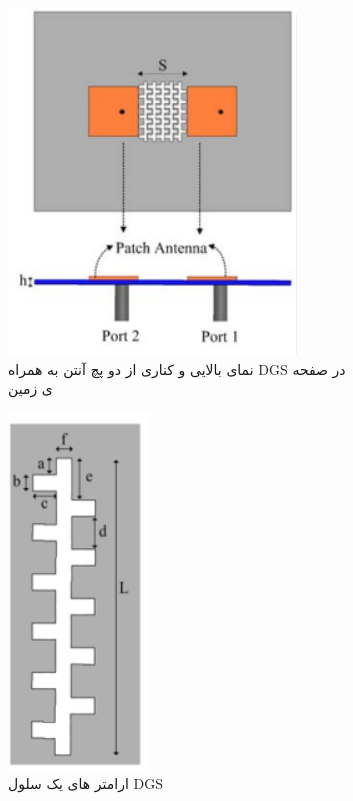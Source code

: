 \begin{figure}
	\centering
	\begin{subfigure}{0.5\textwidth} %
		\includegraphics[scale=0.25]{Images/fig27.png}
		\caption{نمای بالایی و کناری از دو پچ آنتن به همراه DGS در صفحه ی زمین} %
		\label{fig27}
	\end{subfigure}
	\vspace{1em} %
	\begin{subfigure}{0.5\textwidth} %
		\includegraphics[scale=0.25]{Images/fig28.png}
		\caption{ارامتر های یک سلول DGS} %
		\label{fig28}
	\end{subfigure}
	\caption{}
\end{figure}
 
